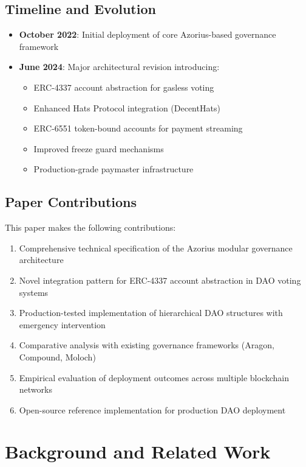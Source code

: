 \documentclass[11pt,a4paper]{article}
\begin{document}
\subsection{Timeline and Evolution}

\begin{itemize}
    \item \textbf{October 2022}: Initial deployment of core Azorius-based governance framework
    \item \textbf{June 2024}: Major architectural revision introducing:
    \begin{itemize}
        \item ERC-4337 account abstraction for gasless voting
        \item Enhanced Hats Protocol integration (DecentHats)
        \item ERC-6551 token-bound accounts for payment streaming
        \item Improved freeze guard mechanisms
        \item Production-grade paymaster infrastructure
    \end{itemize}
\end{itemize}

\subsection{Paper Contributions}

This paper makes the following contributions:

\begin{enumerate}
    \item Comprehensive technical specification of the Azorius modular governance architecture
    \item Novel integration pattern for ERC-4337 account abstraction in DAO voting systems
    \item Production-tested implementation of hierarchical DAO structures with emergency intervention
    \item Comparative analysis with existing governance frameworks (Aragon, Compound, Moloch)
    \item Empirical evaluation of deployment outcomes across multiple blockchain networks
    \item Open-source reference implementation for production DAO deployment
\end{enumerate}

\section{Background and Related Work}
\end{document}

